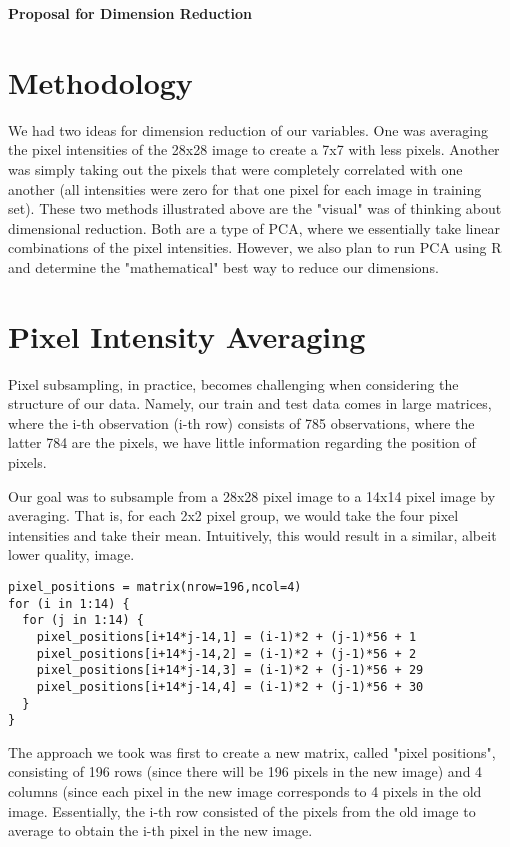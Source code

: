 \documentclass[10pt]{extarticle}
\begin{document}
\noindent
{}

\begin{center}
\LARGE{\textbf{Proposal for Dimension Reduction}}
\end{center}

\section{Methodology}
\blank

We had two ideas for dimension reduction of our variables. One was averaging the pixel intensities of the 28x28 image to create a 7x7 with less pixels. Another was simply taking out the pixels that were completely correlated with one another (all intensities were zero for that one pixel for each image in training set). These two methods illustrated above are the "visual" was of thinking about dimensional reduction. Both are a type of PCA, where we essentially take linear combinations of the pixel intensities. However, we also plan to run PCA using R and determine the "mathematical" best way to reduce our dimensions.

\section{Pixel Intensity Averaging}
Pixel subsampling, in practice, becomes challenging when considering the structure of our data. Namely, our train and test data comes in large matrices, where the i-th observation (i-th row) consists of 785 observations, where the latter 784 are the pixels, we have little information regarding the position of pixels. 

Our goal was to subsample from a 28x28 pixel image to a 14x14 pixel image by averaging. That is, for each 2x2 pixel group, we would take the four pixel intensities and take their mean. Intuitively, this would result in a similar, albeit lower quality, image.  

\begin{verbatim}
pixel_positions = matrix(nrow=196,ncol=4)
for (i in 1:14) {
  for (j in 1:14) {
    pixel_positions[i+14*j-14,1] = (i-1)*2 + (j-1)*56 + 1
    pixel_positions[i+14*j-14,2] = (i-1)*2 + (j-1)*56 + 2
    pixel_positions[i+14*j-14,3] = (i-1)*2 + (j-1)*56 + 29
    pixel_positions[i+14*j-14,4] = (i-1)*2 + (j-1)*56 + 30
  }
}
\end{verbatim}
The approach we took was first to create a new matrix, called "pixel positions", consisting of 196 rows (since there will be 196 pixels in the new image) and 4 columns (since each pixel in the new image corresponds to 4 pixels in the old image. Essentially, the i-th row consisted of the pixels from the old image to average to obtain the i-th pixel in the new image. 
\end{document}
